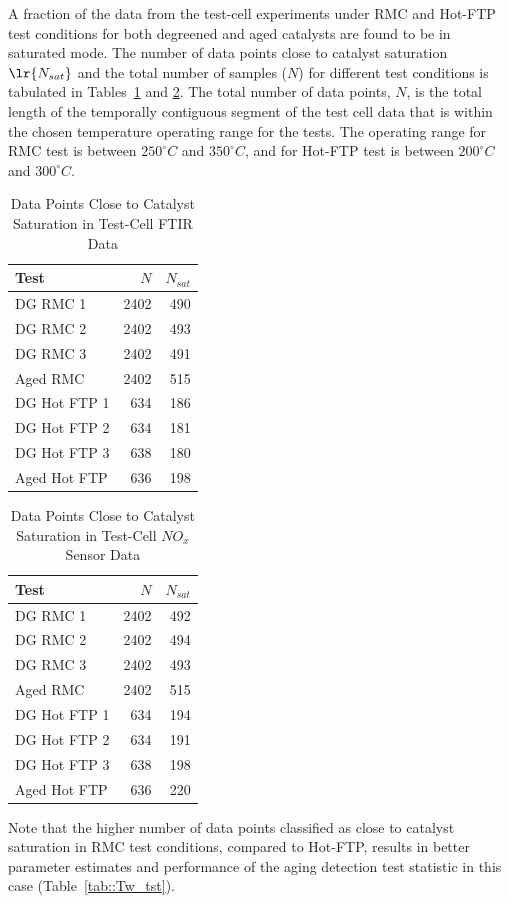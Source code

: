 A fraction of the data from the test-cell experiments under RMC and Hot-FTP
test conditions for both degreened and aged catalysts are found to be in
saturated mode. The number of data points close to catalyst saturation
$\lr{N_{sat}}$ and the total number of samples ($N$) for different test
conditions is tabulated in Tables~\ref{tab::sat_data_perc_ssd} and
\ref{tab::sat_data_perc_iod}.  The total number of data points, $N$, is the
total length of the temporally contiguous segment of the test cell data that is
within the chosen temperature operating range for the tests. The operating
range for RMC test is between $250^\circ C$ and $350^\circ C$, and for Hot-FTP
test is between $200^\circ C$ and $300^\circ C$.
\begin{table}[!ht]
        \centering
        \caption{Data Points Close to Catalyst Saturation in Test-Cell FTIR Data}
        \label{tab::sat_data_perc_ssd}
        \begin{tabular}{l r r}
                \hline \hline
                Test & $N$ & $N_{sat}$ \\\hline \hline
                DG RMC 1  & 2402 & 490  \\
                DG RMC 2  & 2402 & 493  \\
                DG RMC 3  & 2402 & 491  \\
                Aged RMC  & 2402 & 515  \\ \hline
                DG Hot FTP 1 & 634 & 186  \\
                DG Hot FTP 2 & 634 & 181  \\
                DG Hot FTP 3 & 638 & 180  \\
                Aged Hot FTP & 636 & 198  \\
                \hline\hline
        \end{tabular}
\end{table}
\begin{table}[!ht]
        \centering
        \caption{Data Points Close to Catalyst Saturation in Test-Cell $NO_x$ Sensor Data}
        \label{tab::sat_data_perc_iod}
        \begin{tabular}{l r r}
                \hline \hline
                Test & $N$ & $N_{sat}$ \\\hline \hline
                DG RMC 1  & 2402 & 492  \\
                DG RMC 2  & 2402 & 494  \\
                DG RMC 3  & 2402 & 493  \\
                Aged RMC  & 2402 & 515  \\ \hline
                DG Hot FTP 1 & 634 & 194  \\
                DG Hot FTP 2 & 634 & 191  \\
                DG Hot FTP 3 & 638 & 198  \\
                Aged Hot FTP & 636 & 220  \\
                \hline\hline
        \end{tabular}
\end{table}
Note that the higher number of data points classified as close to catalyst saturation in RMC test conditions, compared
to Hot-FTP, results in better parameter estimates and performance of the aging detection test statistic in this case
(Table~\ref{tab::Tw_tst}).
